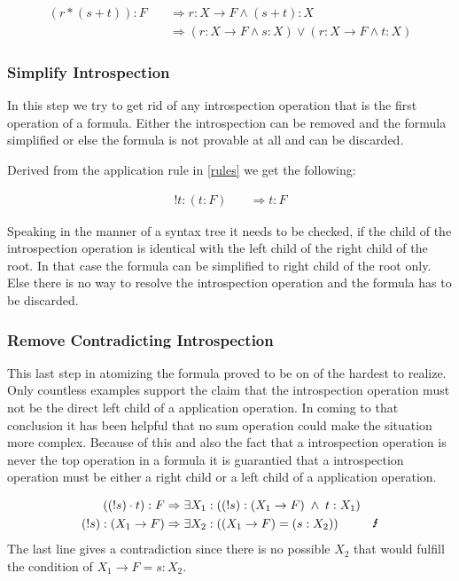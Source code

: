\begin{align}\label{ss2}
	(r*(s+t)):F  \quad & \Rightarrow r: X \rightarrow F \land (s+t): X \\
	& \Rightarrow ( r: X \rightarrow F \land s: X ) \lor ( r: X \rightarrow F \land t: X )
\end{align}



\subsubsection{Simplify Introspection}
In this step we try to get rid of any introspection operation that is the first operation of a formula. Either the introspection can be removed and the formula simplified or else the formula is not provable at all and can be discarded.

Derived from the application rule in \ref{rules} we get the following:

\begin{align}\label{sb}
	!t:(t:F) \quad & \Rightarrow t: F
\end{align}



Speaking in the manner of a syntax tree it needs to be checked, if the child of the introspection operation is identical with the left child of the right child of the root. In that case the formula can be simplified to right child of the root only. Else there is no way to resolve the introspection operation and the formula has to be discarded.

\subsubsection{Remove Contradicting Introspection}
This last step in atomizing the formula proved to be on of the hardest to realize. Only countless examples support the claim that the introspection operation must not be the direct left child of a application operation. In coming to that conclusion it has been helpful that no sum operation could make the situation more complex. Because of this and also the fact that a introspection operation is never the top operation in a formula it is guarantied that a introspection operation must be either a right child or a left child of a application operation.

\begin{align}\label{bb}
	((!s)\cdot t):F  & \Rightarrow \exists X_1 : ((!s): (X_1 \rightarrow F) \; \land \; t: X_1)\\
	(!s): (X_1 \rightarrow F)  &\Rightarrow \exists X_2 : ((X_1 \rightarrow F) = (s:X_2)) & \text{\Lightning}
\end{align}
The last line gives a contradiction since there is no possible $X_2$ that would fulfill the condition of $X_1 \rightarrow F = s:X_2$.

